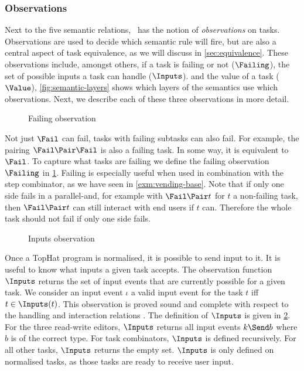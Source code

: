 \subsubsection{Observations}

Next to the five semantic relations, \TOPHAT\ has the notion of \emph{observations} on tasks.
Observations are used to decide which semantic rule will fire,
but are also a central aspect of task equivalence,
as we will discuss in \cref{sec:equivalence}.
These observations include, amongst others,
if a task is failing or not ($\Failing$),
the set of possible inputs a task can handle ($\Inputs$).
and the value of a task ($\Value$),
\cref{fig:semantic-layers} shows which layers of the semantics use which observations.
Next, we describe each of these three observations in more detail.

\begin{figure}
  \caption{Failing observation}
  \label{fig:observation-failing}
\end{figure}

Not just $\Fail$ can fail, tasks with failing subtasks can also fail.
For example, the pairing $\Fail \Pair \Fail$ is also a failing task.
In some way, it is equivalent to $\Fail$.
To capture what tasks are failing we define the failing observation $\Failing$ in \cref{fig:observation-failing}.
Failing is especially useful when used in combination with the step combinator,
as we have seen in \cref{exm:vending-base}.
Note that if only one side fails in a parallel-and,
for example with $\Fail \Pair t$ for $t$ a non-failing task,
then $\Fail \Pair t$ can still interact with end users if $t$ can.
Therefore the whole task should not fail if only one side fails.

\begin{figure}
  \caption{Inputs observation}
  \label{fig:observation-inputs}
\end{figure}

Once a TopHat program is normalised, it is possible to send input to it.
It is useful to know what inputs a given task accepts.
The observation function $\Inputs$ returns the set of input events that are currently possible for a given task.
We consider an input event $\iota$ a valid input event for the task $t$ iff $t \in \Inputs(t)$.
This observation is proved sound and complete with respect to the handling and interaction relations \cite{Steenvoorden22}.
The definition of $\Inputs$ is given in \cref{fig:observation-inputs}.
For the three read-write editors, $\Inputs$ returns all input events $k \Send b$ where $b$ is of the correct type.
For task combinators, $\Inputs$ is defined recursively.
For all other tasks, $\Inputs$ returns the empty set.
$\Inputs$ is only defined on normalised tasks, as those tasks are ready to receive user input.

